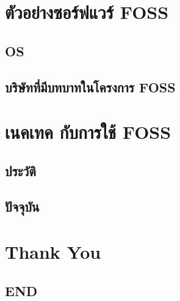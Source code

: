 \documentclass[aspectratio=169,xetex,compress,xcolor={table}]{beamer}
\begin{document}
\section{ตัวอย่างซอร์ฟแวร์ FOSS}
\subsection{OS}


\subsection{บริษัทที่มีบทบาทในโครงการ FOSS}



\section{เนคเทค กับการใช้ FOSS }
\subsection{ประวัติ}


\subsection{ปัจจุบัน}


\section*{Thank You}
\subsection*{END}

\end{document}
